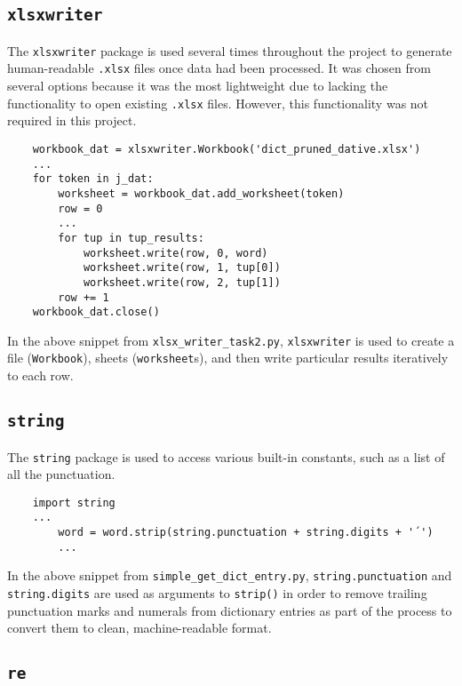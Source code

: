 \documentclass{article}      %
\begin{document}
	\subsection{\texttt{xlsxwriter}}
	
	The \texttt{xlsxwriter} package is used several times throughout the project to generate human-readable \texttt{.xlsx} files once data had been processed. It was chosen from several options because it was the most lightweight due to lacking the functionality to open existing \texttt{.xlsx} files. However, this functionality was not required in this project.
	
	\begin{verbatim}
	workbook_dat = xlsxwriter.Workbook('dict_pruned_dative.xlsx')
	...
	for token in j_dat:
		worksheet = workbook_dat.add_worksheet(token)
		row = 0
		...
		for tup in tup_results:
			worksheet.write(row, 0, word)
			worksheet.write(row, 1, tup[0])
			worksheet.write(row, 2, tup[1])
		row += 1
	workbook_dat.close()
	\end{verbatim}
	
	In the above snippet from \texttt{xlsx\_writer\_task2.py}, \texttt{xlsxwriter} is used to create a file (\texttt{Workbook}), sheets (\texttt{worksheet}s), and then write particular results iteratively to each row.
	
	\subsection{\texttt{string}}
	
	The \texttt{string} package is used to access various built-in constants, such as a list of all the punctuation.
	
	\begin{verbatim}
	import string
	...
		word = word.strip(string.punctuation + string.digits + '´')
		...
	\end{verbatim}
	
	In the above snippet from \texttt{simple\_get\_dict\_entry.py}, \texttt{string.punctuation} and \texttt{string.digits} are used as arguments to \texttt{strip()} in order to remove trailing punctuation marks and numerals from dictionary entries as part of the process to convert them to clean, machine-readable format.
	
	\subsection{\texttt{re}}
	
\end{document}
